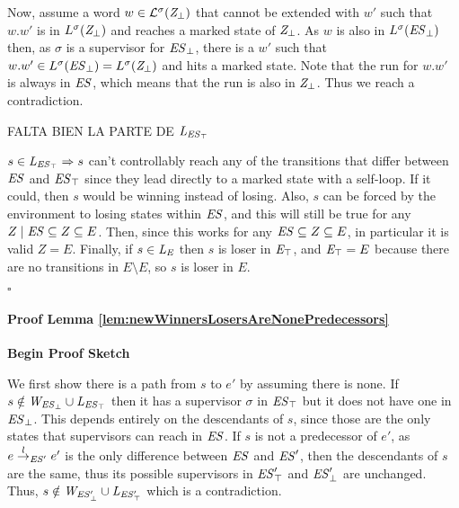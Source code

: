 Now, assume a word $w \in 
\mathcal{L}^\sigma(\mathit{Z_{\bot}})$ that cannot be extended with $w'$ such that $w.w'$ is 
in $L^\sigma(\mathit{Z_{\bot}})$ and reaches a marked state of $\mathit{Z_{\bot}}$. 
As  $w$ is also in $L^\sigma(\mathit{\mathit{ES}_{\bot}})$ then, as
$\sigma$ is a supervisor for $\mathit{\mathit{ES}_{\bot}}$, there is a $w'$ such that 
$w.w' \in L^\sigma(\mathit{\mathit{ES}_{\bot}}) = L^\sigma(\mathit{Z_{\bot}})$ 
and hits a marked state. Note that the run for $w.w'$ is always in $\mathit{ES}$, which means 
that the run is also in $\mathit{Z_{\bot}}$. Thus we reach a contradiction.

FALTA BIEN LA PARTE DE $\mathit{L_{\mathit{\mathit{ES}_{\top}}}}$

 $s \in \mathit{L_{\mathit{\mathit{ES}_{\top}}}} \Rightarrow s$ can't controllably reach any of the transitions that differ between $\mathit{ES}$ and $\mathit{\mathit{ES}_{\top}}$ since they lead directly to a marked state with a self-loop. If it could, then $s$ would be winning instead of losing. Also, $s$ can be forced by the environment to losing states within $\mathit{ES}$, and this will still be true for any $Z \mid \mathit{ES} \subseteq Z \subseteq E$.
Then, since this works for any $\mathit{ES} \subseteq Z \subseteq E$, in particular it is valid $Z = E$. 
Finally, if $s \in \mathit{L_E}$ then $s$ is loser in $\mathit{E_{\top}}$, and $\mathit{E_{\top}} = E$ because there are no transitions in $E \setminus E$, so $s$ is loser in $E$.
\begin{flushright}
$\square$
\end{flushright}


\paragraph*{Proof Lemma 
\ref{lem:newWinnersLosersAreNonePredecessors}}
\textbf{{Begin Proof Sketch}}

We first show there is a path from $s$ to $e'$ by assuming there is none. If $s \notin 
\mathit{W_{\mathit{\mathit{ES}_{\bot}}}} \cup \mathit{L_{\mathit{\mathit{ES}_{\top}}}}$ then it has a supervisor $\sigma$ in 
$\mathit{\mathit{ES}_{\top}}$ but it does not have one in 
$\mathit{\mathit{ES}_{\bot}}$. This depends entirely on the descendants of 
$s$, since those are the only states that supervisors can reach in $\mathit{ES}$. If $s$ 
is not a predecessor of $e'$, as $e \overset{l}{\rightarrow}_{\mathit{ES}'} e'$ is the only difference 
between $\mathit{ES}$ and $\mathit{ES}'$, then the descendants of $s$ are the same, 
thus its possible supervisors in $\mathit{\mathit{ES}'_{\top}}$ and 
$\mathit{\mathit{ES}'_{\bot}}$ are unchanged. Thus, $s \notin \mathit{W_{\mathit{\mathit{ES}'_{\bot}}}} \cup 
\mathit{L_{\mathit{\mathit{ES}'_{\top}}}}$ which is a contradiction.

